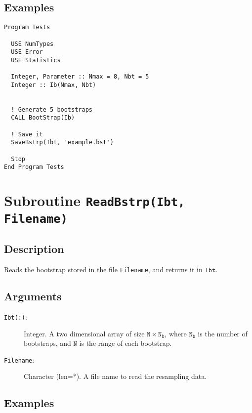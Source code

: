 \subsection{Examples}

\begin{lstlisting}[emph=SaveBstrp,
                   emphstyle=\color{blue},
                   frame=trBL,
                   caption=Reading the resampling info.,
                   label=SaveBstrp]
Program Tests

  USE NumTypes
  USE Error
  USE Statistics

  Integer, Parameter :: Nmax = 8, Nbt = 5
  Integer :: Ib(Nmax, Nbt)


  ! Generate 5 bootstraps
  CALL BootStrap(Ib)

  ! Save it
  SaveBstrp(Ibt, 'example.bst')

  Stop
End Program Tests
\end{lstlisting}

\section{Subroutine \texttt{ReadBstrp(Ibt, Filename)}}

\subsection{Description}

Reads the bootstrap stored in the file \texttt{Filename}, and returns
it in  $\mathtt{Ibt}$.

\subsection{Arguments}

\begin{description}
\item[\texttt{Ibt(:)}:] Integer. A two dimensional array of size
  $\mathtt{N\times N_b}$, where $\mathtt{N_b}$ is the number of
  bootstraps, and $\mathtt{N}$ is the range of each bootstrap.
\item[\texttt{Filename}: ] Character (len=*). A file name to read the
  resampling data.
\end{description}

\subsection{Examples}

